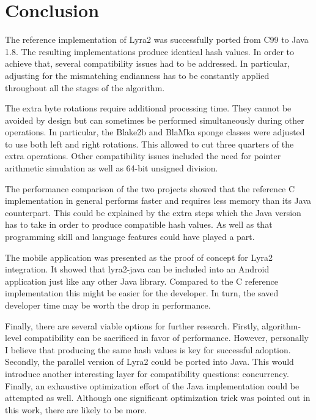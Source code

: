 \chapter{Conclusion}
\label{sec:conclusion}

The reference implementation of Lyra2 was successfully ported from C99 to Java 1.8. The resulting implementations produce identical hash values. In order to achieve that, several compatibility issues had to be addressed. In particular, adjusting for the mismatching endianness has to be constantly applied throughout all the stages of the algorithm.

The extra byte rotations require additional processing time. They cannot be avoided by design but can sometimes be performed simultaneously during other operations. In particular, the Blake2b and BlaMka sponge classes were adjusted to use both left and right rotations. This allowed to cut three quarters of the extra operations. Other compatibility issues included the need for pointer arithmetic simulation as well as 64-bit unsigned division.

The performance comparison of the two projects showed that the reference C implementation in general performs faster and requires less memory than its Java counterpart. This could be explained by the extra steps which the Java version has to take in order to produce compatible hash values. As well as that programming skill and language features could have played a part.

The mobile application was presented as the proof of concept for Lyra2 integration. It showed that lyra2-java can be included into an Android application just like any other Java library. Compared to the C reference implementation this might be easier for the developer. In turn, the saved developer time may be worth the drop in performance.

Finally, there are several viable options for further research. Firstly, algorithm-level compatibility can be sacrificed in favor of performance. However, personally I believe that producing the same hash values is key for successful adoption. Secondly, the parallel version of Lyra2 could be ported into Java. This would introduce another interesting layer for compatibility questions: concurrency. Finally, an exhaustive optimization effort of the Java implementation could be attempted as well. Although one significant optimization trick was pointed out in this work, there are likely to be more.
